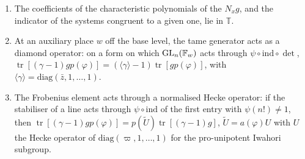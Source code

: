 \begin{proposition}\label{prop:dictionary}
\begin{enumerate}[label=\textup{(\alph*)}]
\item The coefficients of the characteristic polynomials of the $N_xg$, and the indicator of the systems congruent to a given one, lie in $\mathbb T$.
\item At an auxiliary place $w$ off the base level, the tame generator acts as a diamond operator: on a form on which $\operatorname{GL}_n(\mathbb{F}_w)$ acts through $\psi\circ\mathrm{ind}\circ\det$, $\operatorname{tr}[(\gamma-1)gp(\varphi)]=(\langle\gamma\rangle-1)\operatorname{tr}[gp(\varphi)]$, with
$\langle\gamma\rangle=\mathrm{diag}(\bar z,1,\dots,1)$.
\item The Frobenius element acts through a normalised Hecke operator: if the stabiliser of a line acts through $\psi\circ\mathrm{ind}$ of the first entry with $\psi(n!)\ne1$, then $\operatorname{tr}[(\gamma-1)gp(\varphi)]=p(\tilde U)\operatorname{tr}[(\gamma-1)g]$,
$\tilde U=a(\varphi)U$ with $U$ the Hecke operator of $\mathrm{diag}(\varpi,1,\dots,1)$ for the pro-unipotent Iwahori subgroup.
\end{enumerate}
\end{proposition}

